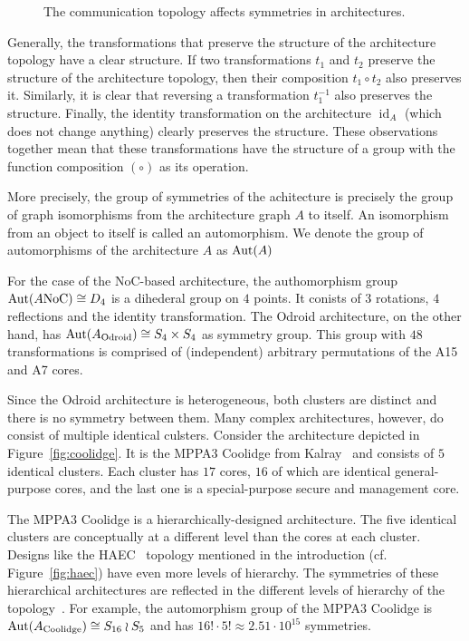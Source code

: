 \begin{figure}[h]
	\centering
\resizebox{0.3\textwidth}{!}{
   \begin{tikzpicture}
     
   \end{tikzpicture}
 }
   \caption{The communication topology affects symmetries in architectures.}
   \label{fig:non_equivalent}
\end{figure}

Generally, the transformations that preserve the structure of the architecture topology have a clear structure.
If two transformations $t_1$ and $t_2$ preserve the structure of the architecture topology, then their composition $t_1 \circ t_2$ also preserves it.
Similarly, it is clear that reversing a transformation $t_1^{-1}$ also preserves the structure.
Finally, the identity transformation on the architecture $\operatorname{id}_A$ (which does not change anything) clearly preserves the structure.
These observations together mean that these transformations have the structure of a group with the function composition $(\circ)$ as its operation.

More precisely, the group of symmetries of the achitecture is precisely the group of graph isomorphisms from the architecture graph $A$ to itself.
An isomorphism from an object to itself is called an automorphism.
We denote the group of automorphisms of the architecture $A$ as $\operatorname{Aut}(A)$

For the case of the \ac{NoC}-based architecture, the authomorphism group $\operatorname{Aut}(A\text{NoC}) \cong D_4$ is a dihederal group on $4$ points.
It conists of $3$ rotations, $4$ reflections and the identity transformation.
The Odroid architecture, on the other hand, has $\operatorname{Aut}(A_\text{Odroid}) \cong S_4 \times S_4$ as symmetry group.
This group with $48$ transformations is comprised of (independent) arbitrary permutations of the A15 and A7 cores.

Since the Odroid architecture is heterogeneous, both clusters are distinct and there is no symmetry between them.
Many complex architectures, however, do consist of multiple identical culsters. Consider the architecture depicted in Figure~\ref{fig:coolidge}.
It is the MPPA3 Coolidge from Kalray~\cite{coolidge} and consists of $5$ identical clusters.
Each cluster has $17$ cores, $16$ of which are identical general-purpose cores, and the last one is a special-purpose secure and management core.

The MPPA3 Coolidge is a hierarchically-designed architecture. The five identical clusters are conceptually at a different level than the cores at each cluster.
Designs like the HAEC~\cite{haec} topology mentioned in the introduction (cf. Figure~\ref{fig:haec}) have even more levels of hierarchy.
The symmetries of these hierarchical architectures are reflected in the different levels of hierarchy of the topology~\cite{goens_tcad21}.
For example, the automorphism group of the MPPA3 Coolidge is $\operatorname{Aut}(A_\text{Coolidge}) \cong S_{16} \wr S_5$ and has $16! \cdot 5! \approx 2.51 \cdot 10^{15}$ symmetries. 

